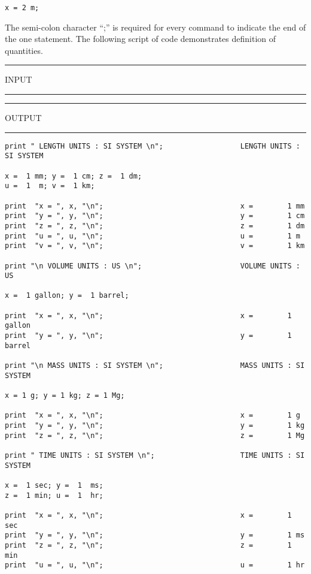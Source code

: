 \begin{footnotesize}
\begin{verbatim}
x = 2 m;
\end{verbatim}
\end{footnotesize}

\vspace{0.15 in}\noindent
The semi-colon character ``;'' is required for every 
command to indicate the end of the one statement.
The following script of code demonstrates definition
of quantities.

\vspace{0.15 in}
\begin{footnotesize}
\noindent
\rule{1.2 in}{0.035 in} INPUT \rule{1.2 in}{0.035 in}\hspace{0.1 in}
\rule{1.3 in}{0.035 in} OUTPUT\rule{1.3 in}{0.035 in}
\begin{verbatim}
print " LENGTH UNITS : SI SYSTEM \n";                  LENGTH UNITS : SI SYSTEM 

x =  1 mm; y =  1 cm; z =  1 dm;
u =  1  m; v =  1 km;

print  "x = ", x, "\n";                                x =        1 mm
print  "y = ", y, "\n";                                y =        1 cm
print  "z = ", z, "\n";                                z =        1 dm
print  "u = ", u, "\n";                                u =        1 m
print  "v = ", v, "\n";                                v =        1 km

print "\n VOLUME UNITS : US \n";                       VOLUME UNITS : US 

x =  1 gallon; y =  1 barrel;

print  "x = ", x, "\n";                                x =        1 gallon
print  "y = ", y, "\n";                                y =        1 barrel

print "\n MASS UNITS : SI SYSTEM \n";                  MASS UNITS : SI SYSTEM 

x = 1 g; y = 1 kg; z = 1 Mg;

print  "x = ", x, "\n";                                x =        1 g
print  "y = ", y, "\n";                                y =        1 kg
print  "z = ", z, "\n";                                z =        1 Mg

print " TIME UNITS : SI SYSTEM \n";                    TIME UNITS : SI SYSTEM 

x =  1 sec; y =  1  ms; 
z =  1 min; u =  1  hr;  

print  "x = ", x, "\n";                                x =        1 sec
print  "y = ", y, "\n";                                y =        1 ms
print  "z = ", z, "\n";                                z =        1 min
print  "u = ", u, "\n";                                u =        1 hr


\end{verbatim}
\end{footnotesize}
